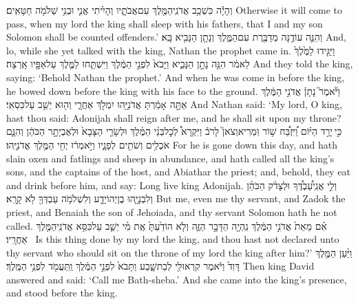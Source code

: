 {וְהָיָ֕ה כִּשְׁכַ֥ב אֲדֹנִֽי\maqqaf הַמֶּ֖לֶךְ עִם\maqqaf אֲבֹתָ֑יו וְהָיִ֗יתִי אֲנִ֛י וּבְנִ֥י שְׁלֹמֹ֖ה חַטָּאִֽים׃}
{Otherwise it will come to pass, when my lord the king shall sleep with his fathers, that I and my son Solomon shall be counted offenders.’}
{וְהִנֵּ֛ה עוֹדֶ֥נָּה מְדַבֶּ֖רֶת עִם\maqqaf הַמֶּ֑לֶךְ וְנָתָ֥ן הַנָּבִ֖יא בָּֽא׃}
{And, lo, while she yet talked with the king, Nathan the prophet came in.}
{וַיַּגִּ֤ידוּ לַמֶּ֙לֶךְ֙ לֵאמֹ֔ר הִנֵּ֖ה נָתָ֣ן הַנָּבִ֑יא וַיָּבֹא֙ לִפְנֵ֣י הַמֶּ֔לֶךְ וַיִּשְׁתַּ֧חוּ לַמֶּ֛לֶךְ עַל\maqqaf אַפָּ֖יו אָֽרְצָה׃}
{And they told the king, saying: ‘Behold Nathan the prophet.’ And when he was come in before the king, he bowed down before the king with his face to the ground.}
{וַיֹּ֘אמֶר֮ נָתָן֒ אֲדֹנִ֣י הַמֶּ֔לֶךְ אַתָּ֣ה אָמַ֔רְתָּ אֲדֹנִיָּ֖הוּ יִמְלֹ֣ךְ אַחֲרָ֑י וְה֖וּא יֵשֵׁ֥ב עַל\maqqaf כִּסְאִֽי׃}
{And Nathan said: ‘My lord, O king, hast thou said: Adonijah shall reign after me, and he shall sit upon my throne?}
{כִּ֣י \legarmeh  יָרַ֣ד הַיּ֗וֹם וַ֠יִּזְבַּ֠ח שׁ֥וֹר וּֽמְרִיא\maqqaf וְצֹאן֮ לָרֹב֒ וַיִּקְרָא֩ לְכׇל\maqqaf בְּנֵ֨י הַמֶּ֜לֶךְ וּלְשָׂרֵ֤י הַצָּבָא֙ וּלְאֶבְיָתָ֣ר הַכֹּהֵ֔ן וְהִנָּ֛ם אֹכְלִ֥ים וְשֹׁתִ֖ים לְפָנָ֑יו וַיֹּ֣אמְר֔וּ יְחִ֖י הַמֶּ֥לֶךְ אֲדֹנִיָּֽהוּ׃}
{For he is gone down this day, and hath slain oxen and fatlings and sheep in abundance, and hath called all the king’s sons, and the captains of the host, and Abiathar the priest; and, behold, they eat and drink before him, and say: Long live king Adonijah.}
{וְלִ֣י אֲנִֽי\maqqaf עַ֠בְדֶּ֠ךָ וּלְצָדֹ֨ק הַכֹּהֵ֜ן וְלִבְנָיָ֧הוּ בֶן\maqqaf יְהוֹיָדָ֛ע וְלִשְׁלֹמֹ֥ה עַבְדְּךָ֖ לֹ֥א קָרָֽא׃}
{But me, even me thy servant, and Zadok the priest, and Benaiah the son of Jehoiada, and thy servant Solomon hath he not called.}
{אִ֗ם מֵאֵת֙ אֲדֹנִ֣י הַמֶּ֔לֶךְ נִֽהְיָ֖ה הַדָּבָ֣ר הַזֶּ֑ה וְלֹ֤א הוֹדַ֙עְתָּ֙ אֶֽת\maqqaf {} מִ֗י יֵשֵׁ֛ב עַל\maqqaf כִּסֵּ֥א אֲדֹנִֽי\maqqaf הַמֶּ֖לֶךְ אַחֲרָֽיו׃ \setuma }
{Is this thing done by my lord the king, and thou hast not declared unto thy servant who should sit on the throne of my lord the king after him?’}
{וַיַּ֨עַן הַמֶּ֤לֶךְ דָּוִד֙ וַיֹּ֔אמֶר קִרְאוּ\maqqaf לִ֖י לְבַת\maqqaf שָׁ֑בַע וַתָּבֹא֙ לִפְנֵ֣י הַמֶּ֔לֶךְ וַֽתַּעֲמֹ֖ד לִפְנֵ֥י הַמֶּֽלֶךְ׃}
{Then king David answered and said: ‘Call me Bath-sheba.’ And she came into the king’s presence, and stood before the king.}
